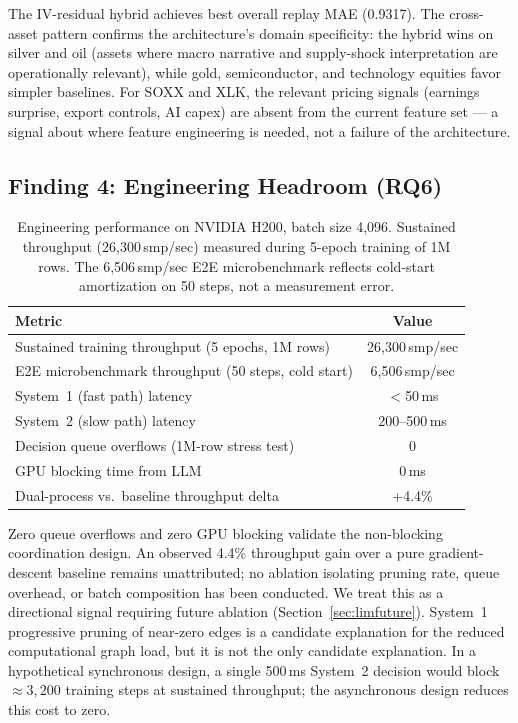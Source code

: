\documentclass[11pt,a4paper]{article}
\begin{document}
The IV-residual hybrid achieves best overall replay MAE (0.9317). The cross-asset
pattern confirms the architecture's domain specificity: the hybrid wins on silver and
oil (assets where macro narrative and supply-shock interpretation are operationally
relevant), while gold, semiconductor, and technology equities favor simpler baselines.
For SOXX and XLK, the relevant pricing signals (earnings surprise, export controls,
AI capex) are absent from the current feature set --- a signal about where feature
engineering is needed, not a failure of the architecture.

\subsection{Finding 4: Engineering Headroom (RQ6)}
\label{sec:experiments:headroom}

\begin{table}[ht]
\centering
\caption{Engineering performance on NVIDIA H200, batch size 4,096. Sustained
throughput (26,300\,smp/sec) measured during 5-epoch training of 1M rows. The
6,506\,smp/sec E2E microbenchmark reflects cold-start amortization on 50 steps, not
a measurement error.}
\begin{tabular}{@{}lc@{}}
\toprule
Metric & Value \\ \midrule
Sustained training throughput (5 epochs, 1M rows) & 26,300\,smp/sec \\
E2E microbenchmark throughput (50 steps, cold start) & 6,506\,smp/sec \\
System~1 (fast path) latency & $<$50\,ms \\
System~2 (slow path) latency & 200--500\,ms \\
Decision queue overflows (1M-row stress test) & 0 \\
GPU blocking time from LLM & 0\,ms \\
Dual-process vs.\ baseline throughput delta & +4.4\% \\
\bottomrule
\end{tabular}
\label{tab:engineering}
\end{table}

Zero queue overflows and zero GPU blocking validate the non-blocking coordination
design. An observed 4.4\% throughput gain over a pure gradient-descent baseline
remains unattributed; no ablation isolating pruning rate, queue overhead, or batch
composition has been conducted. We treat this as a directional signal requiring future
ablation (Section~\ref{sec:limfuture}). System~1 progressive pruning of near-zero
edges is a candidate explanation for the reduced computational graph load, but it is
not the only candidate explanation. In a hypothetical synchronous design, a single
500\,ms System~2 decision would block $\approx 3{,}200$ training steps at sustained
throughput; the asynchronous design reduces this cost to zero.
\end{document}

